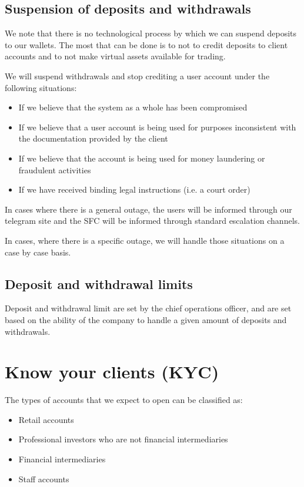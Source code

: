 \subsection{Suspension of deposits and withdrawals}
We note that there is no technological process by which we can suspend
deposits to our wallets.  The most that can be done is to not to
credit deposits to client accounts and to not make virtual assets
available for trading.

We will suspend withdrawals and stop crediting a user account under
the following situations:
\begin{itemize}
\item If we believe that the system as a whole has been compromised
\item If we believe that a user account is being used for purposes
  inconsistent with the documentation provided by the client
\item If we believe that the account is being used for money
  laundering or fraudulent activities
\item If we have received binding legal instructions (i.e. a court order)
\end{itemize}

In cases where there is a general outage, the users will be informed
through our telegram site and the SFC will be informed through
standard escalation channels.

In cases, where there is a specific outage, we will handle those
situations on a case by case basis.

\subsection{Deposit and withdrawal limits}
Deposit and withdrawal limit are set by the chief operations officer,
and are set based on the ability of the company to handle a given
amount of deposits and withdrawals.

\section{Know your clients (KYC)}

The types of accounts that we expect to open can be classified as:

\begin{itemize}
\item Retail accounts
\item Professional investors who are not financial intermediaries
\item Financial intermediaries
\item Staff accounts
  \end{itemize}

